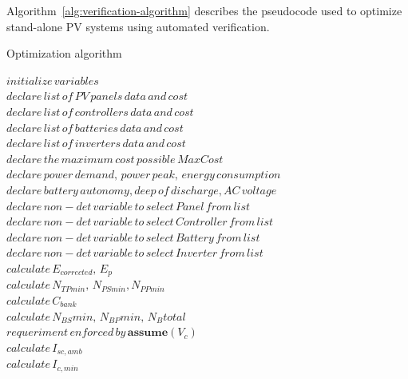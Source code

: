 \documentclass[10pt,conference]{IEEEtran}
\begin{document}
Algorithm~\ref{alg:verification-algorithm} describes the pseudocode used to optimize stand-alone PV systems using automated verification. 
%
 \begin{algorithm}
 \caption{Optimization algorithm}
 \begin{algorithmic}[1]
 \begin{scriptsize}
 
 \renewcommand{\algorithmicrequire}{\textbf{Input:}}
 \renewcommand{\algorithmicensure}{\textbf{Output:}}
  \STATE $initialize \, variables$ \\
  \STATE $declare \, list \, of \, PV \, panels \, data \, and \, cost $ \\
  \STATE $declare \, list \, of \, controllers \, data \, and \, cost $ \\
  \STATE $declare \, list \, of \, batteries \, data \,  and \, cost $ \\
  \STATE $declare \, list \, of \, inverters \, data \,  and \, cost $ \\
  \STATE $declare \, the \, maximum \, cost \, possible \, MaxCost $  \\
  \STATE $declare \, power \, demand, \, power \, peak, \, energy \, consumption $ \\
  \STATE $declare \, battery\,  autonomy, deep \, of \, discharge, AC \, voltage$ \\
 	\STATE $declare \, non-det \, variable \, to \, select \, Panel \, from \, list$ \\
 	\STATE $declare \, non-det \, variable \, to \, select \, Controller \, from \, list $ \\
 	\STATE $declare \, non-det \, variable \, to \, select \, Battery \, from \, list $ \\
 	\STATE $declare \, non-det \, variable \, to \, select \, Inverter \, from \, list $ \\ 	
 	\STATE $calculate \, E_{corrected}, \, E_{p} $ \\
	\STATE $calculate \, N_{TPmin}, \, N_{PSmin}, N_{PPmin} $ \\
 	\STATE $calculate \, C_{bank}$ \\
	\STATE $calculate \, N_{BS}min, \, N_{BP}min, \, N_{B}total$ \\
	\STATE $requeriment \, enforced \, by \, \textbf{assume}(V_{c})$ \\
 	\STATE $calculate \, I_{sc,amb}$ \\
 	\STATE $calculate \, I_{c,min}$ \\

\end{scriptsize}
\end{algorithmic}
\end{algorithm}
\end{document}
